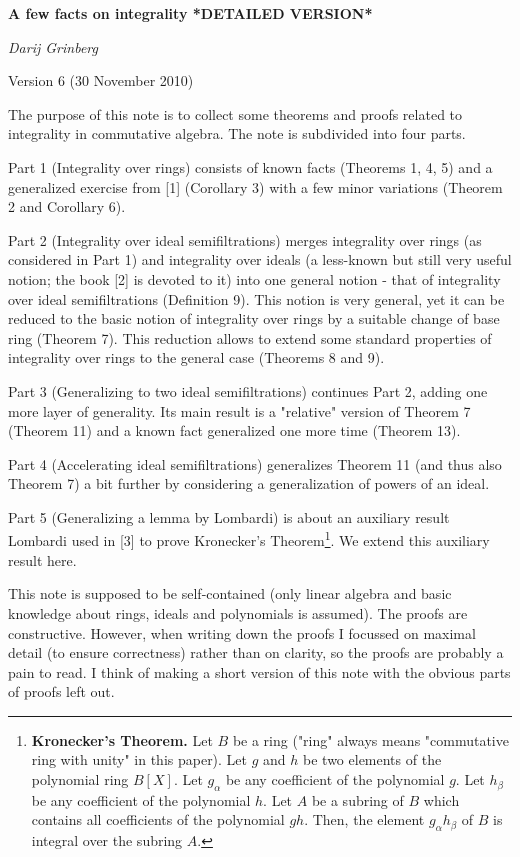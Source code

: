 \documentclass[12pt,final,notitlepage,onecolumn]{article}%
\begin{document}
\color{black}

\begin{center}
\textbf{A few facts on integrality *DETAILED VERSION*}

\textit{Darij Grinberg}

Version 6 (30 November 2010)
\end{center}

The purpose of this note is to collect some theorems and proofs related to
integrality in commutative algebra. The note is subdivided into four parts.

Part 1 (Integrality over rings) consists of known facts (Theorems 1, 4, 5) and
a generalized exercise from [1] (Corollary 3) with a few minor variations
(Theorem 2 and Corollary 6).

Part 2 (Integrality over ideal semifiltrations) merges integrality over rings
(as considered in Part 1) and integrality over ideals (a less-known but still
very useful notion; the book [2] is devoted to it) into one general notion -
that of integrality over ideal semifiltrations (Definition 9). This notion is
very general, yet it can be reduced to the basic notion of integrality over
rings by a suitable change of base ring (Theorem 7). This reduction allows to
extend some standard properties of integrality over rings to the general case
(Theorems 8 and 9).

Part 3 (Generalizing to two ideal semifiltrations) continues Part 2, adding
one more layer of generality. Its main result is a "relative" version of
Theorem 7 (Theorem 11) and a known fact generalized one more time (Theorem 13).

Part 4 (Accelerating ideal semifiltrations) generalizes Theorem 11 (and thus
also Theorem 7) a bit further by considering a generalization of powers of an ideal.

Part 5 (Generalizing a lemma by Lombardi) is about an auxiliary result
Lombardi used in [3] to prove Kronecker's Theorem\footnote{\textbf{Kronecker's
Theorem.} Let $B$ be a ring ("ring" always means "commutative ring with unity"
in this paper). Let $g$ and $h$ be two elements of the polynomial ring
$B\left[  X\right]  $. Let $g_{\alpha}$ be any coefficient of the polynomial
$g$. Let $h_{\beta}$ be any coefficient of the polynomial $h$. Let $A$ be a
subring of $B$ which contains all coefficients of the polynomial $gh$. Then,
the element $g_{\alpha}h_{\beta}$ of $B$ is integral over the subring $A$.}.
We extend this auxiliary result here.

This note is supposed to be self-contained (only linear algebra and basic
knowledge about rings, ideals and polynomials is assumed). The proofs are
constructive. However, when writing down the proofs I focussed on maximal
detail (to ensure correctness) rather than on clarity, so the proofs are
probably a pain to read. I think of making a short version of this note with
the obvious parts of proofs left out.
\end{document}
